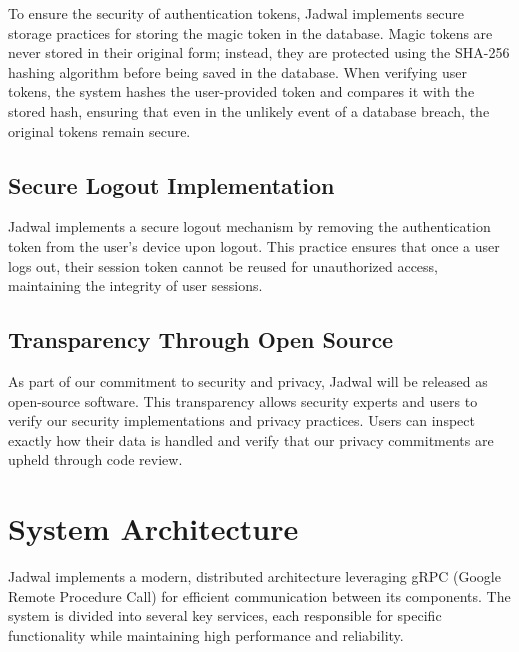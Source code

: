 \documentclass[12pt,a4paper,twoside]{report}
\begin{document}
To ensure the security of authentication tokens, Jadwal implements secure storage practices for storing the magic token in the database. Magic tokens are never stored in their original form; instead, they are protected using the SHA-256 hashing algorithm before being saved in the database. When verifying user tokens, the system hashes the user-provided token and compares it with the stored hash, ensuring that even in the unlikely event of a database breach, the original tokens remain secure.

\subsection{Secure Logout Implementation}

Jadwal implements a secure logout mechanism by removing the authentication token from the user's device upon logout. This practice ensures that once a user logs out, their session token cannot be reused for unauthorized access, maintaining the integrity of user sessions.

\subsection{Transparency Through Open Source}

As part of our commitment to security and privacy, Jadwal will be released as open-source software. This transparency allows security experts and users to verify our security implementations and privacy practices. Users can inspect exactly how their data is handled and verify that our privacy commitments are upheld through code review.


\section{System Architecture}

Jadwal implements a modern, distributed architecture leveraging gRPC (Google Remote Procedure Call) for efficient communication between its components. The system is divided into several key services, each responsible for specific functionality while maintaining high performance and reliability.
\end{document}
